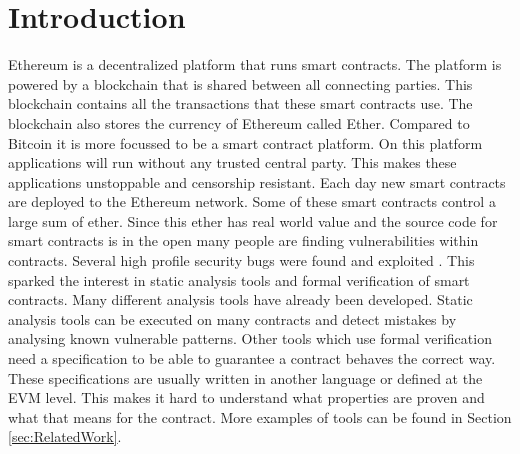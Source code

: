 \documentclass[a4paper]{article}
\begin{document}
\section{Introduction}
Ethereum is a decentralized platform that runs smart contracts. The platform is powered by a blockchain that is shared between all connecting parties. This blockchain contains all the transactions that these smart contracts use. The blockchain also stores the currency of Ethereum called Ether. Compared to Bitcoin it is more focussed to be a smart contract platform. On this platform applications will run without any trusted central party. This makes these applications unstoppable and censorship resistant. Each day new smart contracts are deployed to the Ethereum network. Some of these smart contracts control a large sum of ether. Since this ether has real world value and the source code for smart contracts is in the open many people are finding vulnerabilities within contracts. Several high profile security bugs were found and exploited \cite{parity1, parity2,hkg,dao}. This sparked the interest in static analysis tools and formal verification of smart contracts. Many different analysis tools have already been developed. Static analysis tools can be executed on many contracts and detect mistakes by analysing known vulnerable patterns. Other tools which use formal verification need a specification to be able to guarantee a contract behaves the correct way. These specifications are usually written in another language or defined at the EVM level. This makes it hard to understand what properties are proven and what that means for the contract. More examples of tools can be found in Section \ref{sec:RelatedWork}. 
\end{document}
